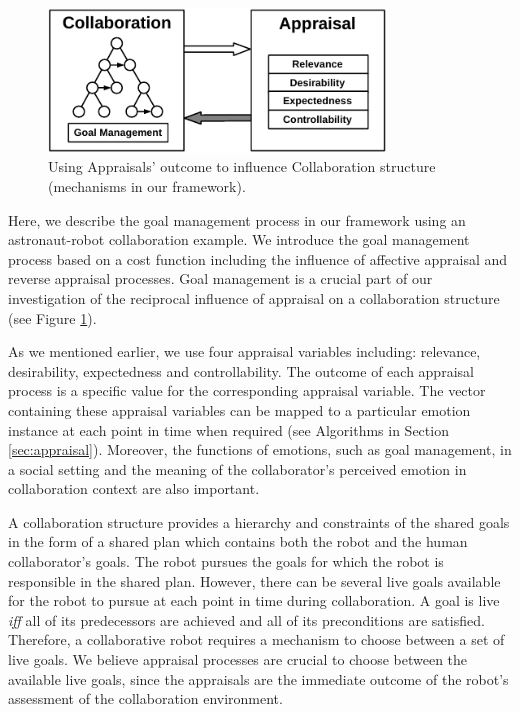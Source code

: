 \documentclass[12pt]{report}
\begin{document}
\begin{figure}[t]
  \centering
  \includegraphics[width=0.8\textwidth]{figure/goal_management_croped.pdf}
  \caption{Using Appraisals' outcome to influence Collaboration structure
  (mechanisms in our framework).}
  \label{fig:appraisal-on-collaboration}
\end{figure}

Here, we describe the goal management process in our framework using an
astronaut-robot collaboration example. We introduce the goal management process
based on a cost function including the influence of affective appraisal and
reverse appraisal processes. Goal management is a crucial part of our
investigation of the reciprocal influence of appraisal on a collaboration
structure (see Figure \ref{fig:appraisal-on-collaboration}).

As we mentioned earlier, we use four appraisal variables including: relevance,
desirability, expectedness and controllability. The outcome of each appraisal
process is a specific value for the corresponding appraisal variable. The vector
containing these appraisal variables can be mapped to a particular emotion
instance at each point in time when required (see Algorithms in Section
\ref{sec:appraisal}). Moreover, the functions of emotions, such as goal
management, in a social setting and the meaning of the collaborator's perceived
emotion in collaboration context are also important.

A collaboration structure provides a hierarchy and constraints of the shared
goals in the form of a shared plan which contains both the robot and the human
collaborator's goals. The robot pursues the goals for which the robot is
responsible in the shared plan. However, there can be several live goals
available for the robot to pursue at each point in time during collaboration. A
goal is live \textit{iff} all of its predecessors are achieved and all of its
preconditions are satisfied. Therefore, a collaborative robot requires a
mechanism to choose between a set of live goals. We believe appraisal processes
are crucial to choose between the available live goals, since the appraisals are
the immediate outcome of the robot's assessment of the collaboration environment.
\end{document}
